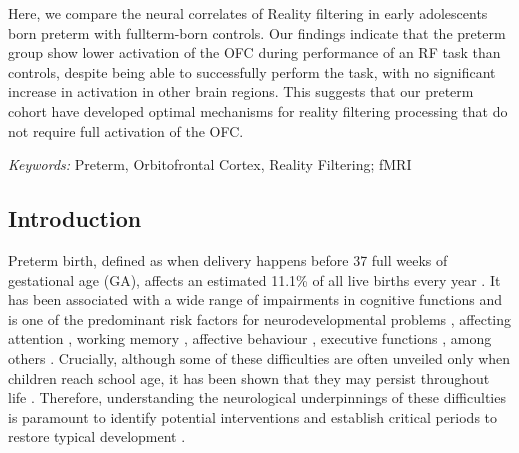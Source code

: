 Here, we compare the neural correlates of Reality filtering in early adolescents born preterm with fullterm-born controls. Our findings indicate that the preterm group show lower activation of the OFC during performance of an RF task than controls, despite being able to successfully perform the task, with no significant increase in activation in other brain regions. This suggests that our preterm cohort have developed optimal mechanisms for reality filtering processing that do not require full activation of the OFC.

\textit{Keywords:} Preterm, Orbitofrontal Cortex, Reality Filtering; fMRI

\subsection{Introduction}



Preterm birth, defined as when delivery happens before 37 full weeks of gestational age (GA), affects an estimated 11.1\% of all live births every year \citep{Blencowe2013}.  
It has been associated with a wide range of impairments in cognitive functions and is one of the predominant risk factors for neurodevelopmental problems \citep{Twilhaar2018}, affecting attention \citep{Rommel2017}, working memory \citep{Allotey2018}, affective behaviour \citep{Hornman2016}, executive functions \citep{Costa2017, Burnett2018}, among others \citep{Moreira2014, Allotey2018}. Crucially, although some of these difficulties are often unveiled only when children reach school age, it has been shown that they may persist throughout life \citep{Anderson2014, Kajantie2019}. Therefore, understanding the neurological underpinnings of these difficulties is paramount to identify potential interventions and establish critical periods to restore typical development \citep{Wolke2019}.
    
